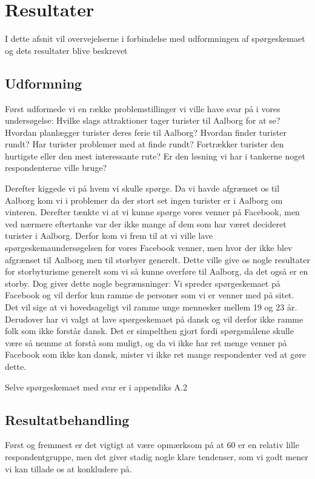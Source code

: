 \section{Resultater}
I dette afsnit vil overvejelserne i forbindelse med udformningen af spørgeskemaet og dets resultater blive beskrevet

\subsection{Udformning}
Først udformede vi en række problemstillinger vi ville have svar på i vores undersøgelse:
Hvilke slags attraktioner tager turister til Aalborg for at se?
Hvordan planlægger turister deres ferie til Aalborg?
Hvordan finder turister rundt?
Har turister problemer med at finde rundt?
Fortrækker turister den hurtigste eller den mest interessante rute?
Er den løsning vi har i tankerne noget respondenterne ville bruge?

Derefter kiggede vi på hvem vi skulle spørge. Da vi havde afgrænset os til Aalborg kom vi i problemer da der stort set ingen turister er i Aalborg om vinteren. Derefter tænkte vi at vi kunne spørge vores venner på Facebook, men ved nærmere eftertanke var der ikke mange af dem som har været decideret turister i Aalborg. Derfor kom vi frem til at vi ville lave spørgeskemaundersøgelsen for vores Facebook venner, men hvor der ikke blev afgrænset til Aalborg men til storbyer generelt. Dette ville give os nogle resultater for storbyturisme generelt som vi så kunne overføre til Aalborg, da det også er en storby. Dog giver dette nogle begrænsninger: Vi spreder spørgeskemaet på Facebook og vil derfor kun ramme de personer som vi er venner med på sitet. Det vil sige at vi hovedsageligt vil ramme unge mennesker mellem 19 og 23 år. Derudover har vi valgt at lave spørgeskemaet på dansk og vil derfor ikke ramme folk som ikke forstår dansk. Det er simpelthen gjort fordi spørgsmålene skulle være så nemme at forstå som muligt, og da vi ikke har ret menge venner på Facebook som ikke kan dansk, mister vi ikke ret mange respondenter ved at gøre dette.

Selve spørgeskemaet med svar er i appendiks A.2

\subsection{Resultatbehandling}
Først og fremmest er det vigtigt at være opmærksom på at 60 er en relativ lille respondentgruppe, men det giver stadig nogle klare tendenser, som vi godt mener vi kan tillade os at konkludere på.


